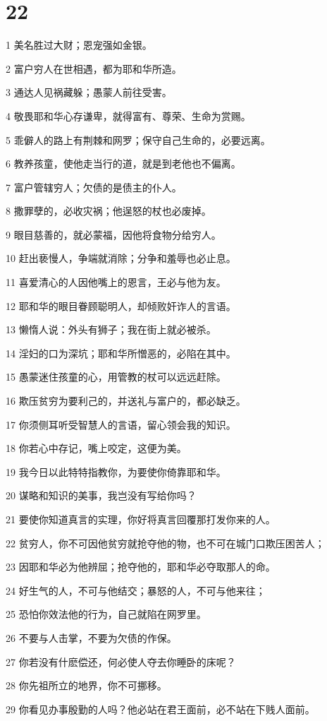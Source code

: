 \chapter{22}

\par 1 美名胜过大财；恩宠强如金银。
\par 2 富户穷人在世相遇，都为耶和华所造。
\par 3 通达人见祸藏躲；愚蒙人前往受害。
\par 4 敬畏耶和华心存谦卑，就得富有、尊荣、生命为赏赐。
\par 5 乖僻人的路上有荆棘和网罗；保守自己生命的，必要远离。
\par 6 教养孩童，使他走当行的道，就是到老他也不偏离。
\par 7 富户管辖穷人；欠债的是债主的仆人。
\par 8 撒罪孽的，必收灾祸；他逞怒的杖也必废掉。
\par 9 眼目慈善的，就必蒙福，因他将食物分给穷人。
\par 10 赶出亵慢人，争端就消除；分争和羞辱也必止息。
\par 11 喜爱清心的人因他嘴上的恩言，王必与他为友。
\par 12 耶和华的眼目眷顾聪明人，却倾败奸诈人的言语。
\par 13 懒惰人说：外头有狮子；我在街上就必被杀。
\par 14 淫妇的口为深坑；耶和华所憎恶的，必陷在其中。
\par 15 愚蒙迷住孩童的心，用管教的杖可以远远赶除。
\par 16 欺压贫穷为要利己的，并送礼与富户的，都必缺乏。
\par 17 你须侧耳听受智慧人的言语，留心领会我的知识。
\par 18 你若心中存记，嘴上咬定，这便为美。
\par 19 我今日以此特特指教你，为要使你倚靠耶和华。
\par 20 谋略和知识的美事，我岂没有写给你吗？
\par 21 要使你知道真言的实理，你好将真言回覆那打发你来的人。
\par 22 贫穷人，你不可因他贫穷就抢夺他的物，也不可在城门口欺压困苦人；
\par 23 因耶和华必为他辨屈；抢夺他的，耶和华必夺取那人的命。
\par 24 好生气的人，不可与他结交；暴怒的人，不可与他来往；
\par 25 恐怕你效法他的行为，自己就陷在网罗里。
\par 26 不要与人击掌，不要为欠债的作保。
\par 27 你若没有什麽偿还，何必使人夺去你睡卧的床呢？
\par 28 你先祖所立的地界，你不可挪移。
\par 29 你看见办事殷勤的人吗？他必站在君王面前，必不站在下贱人面前。

